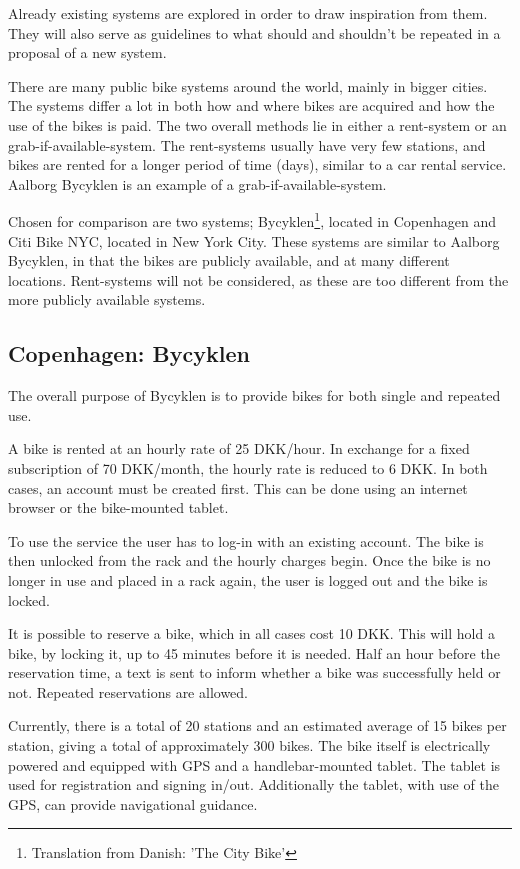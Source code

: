 Already existing systems are explored in order to draw inspiration from them.
They will also serve as guidelines to what should and shouldn't be repeated in a proposal of a new system.

There are many public bike systems around the world, mainly in bigger cities.
The systems differ a lot in both how and where bikes are acquired and how the use of the bikes is paid.
The two overall methods lie in either a rent-system or an grab-if-available-system.
The rent-systems usually have very few stations, and bikes are rented for a longer period of time (days), similar to a car rental service.
Aalborg Bycyklen is an example of a grab-if-available-system.

Chosen for comparison are two systems; Bycyklen\footnote{Translation from Danish: 'The City Bike'}, located in Copenhagen and Citi Bike NYC, located in New York City.
These systems are similar to Aalborg Bycyklen, in that the bikes are publicly available, and at many different locations.
Rent-systems will not be considered, as these are too different from the more publicly available systems.

\subsection{Copenhagen: Bycyklen}
The overall purpose of Bycyklen\cite{cph_bycyklen} is to provide bikes for both single and repeated use.

A bike is rented at an hourly rate of 25 DKK/hour.
In exchange for a fixed subscription of 70 DKK/month, the hourly rate is reduced to 6 DKK.
In both cases, an account must be created first.
This can be done using an internet browser or the bike-mounted tablet.

To use the service the user has to log-in with an existing account.
The bike is then unlocked from the rack and the hourly charges begin.
Once the bike is no longer in use and placed in a rack again, the user is logged out and the bike is locked.

It is possible to reserve a bike, which in all cases cost 10 DKK.
This will hold a bike, by locking it, up to 45 minutes before it is needed.
Half an hour before the reservation time, a text is sent to inform whether a bike was successfully held or not.
Repeated reservations are allowed.

Currently, there is a total of 20 stations and an estimated average of 15 bikes per station, giving a total of approximately 300 bikes.
The bike itself is electrically powered and equipped with GPS and a handlebar-mounted tablet.
The tablet is used for registration and signing in/out.
Additionally the tablet, with use of the GPS, can provide navigational guidance.

